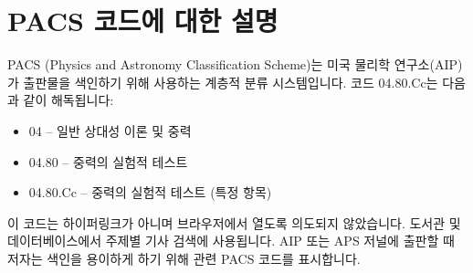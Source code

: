 \documentclass[11pt,a4paper]{article}
\begin{document}
	\section{PACS 코드에 대한 설명}
	\label{app:pacs}
	
	PACS (Physics and Astronomy Classification Scheme)는 미국 물리학 연구소(AIP)가 출판물을 색인하기 위해 사용하는 계층적 분류 시스템입니다. 코드 04.80.Cc는 다음과 같이 해독됩니다:
	\begin{itemize}
		\item 04 – 일반 상대성 이론 및 중력
		\item 04.80 – 중력의 실험적 테스트
		\item 04.80.Cc – 중력의 실험적 테스트 (특정 항목)
	\end{itemize}
	이 코드는 하이퍼링크가 아니며 브라우저에서 열도록 의도되지 않았습니다. 도서관 및 데이터베이스에서 주제별 기사 검색에 사용됩니다. AIP 또는 APS 저널에 출판할 때 저자는 색인을 용이하게 하기 위해 관련 PACS 코드를 표시합니다.
	
\end{document}
